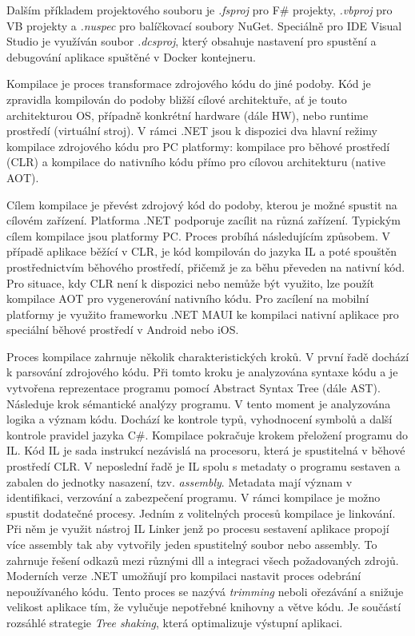 Dalším příkladem projektového souboru je \emph{.fsproj} pro F\# projekty, \emph{.vbproj} pro VB projekty a \emph{.nuspec} pro balíčkovací soubory NuGet. Speciálně pro IDE Visual Studio je využíván soubor \emph{.dcsproj}, který obsahuje nastavení pro spustění a debugování aplikace spuštěné v Docker kontejneru. 


Kompilace je proces transformace zdrojového kódu do jiné podoby. Kód je zpravidla kompilován do podoby bližší cílové architektuře, ať je touto architekturou OS, případně konkrétní hardware (dále HW), nebo runtime prostředí (virtuální stroj). \cite{Richter2012} V rámci .NET jsou k dispozici dva hlavní režimy kompilace zdrojového kódu pro PC platformy: kompilace pro běhové prostředí (CLR) a kompilace do nativního kódu přímo pro cílovou architekturu (native AOT).

Cílem kompilace je převést zdrojový kód do podoby, kterou je možné spustit na cílovém zařízení. Platforma .NET podporuje zacílit na různá zařízení. Typickým cílem kompilace jsou platformy PC. Proces probíhá následujícím způsobem. V případě aplikace běžící v CLR, je kód kompilován do jazyka IL a poté spouštěn prostřednictvím běhového prostředí, přičemž je za běhu převeden na nativní kód. \cite{Richter2012} Pro situace, kdy CLR není k dispozici nebo nemůže být využito, lze použít kompilace AOT pro vygenerování nativního kódu. \cite{Pflug2023} Pro zacílení na mobilní platformy je využito frameworku .NET MAUI ke kompilaci nativní aplikace pro speciální běhové prostředí v Android nebo iOS. \cite{Libery2023}


Proces kompilace zahrnuje několik charakteristických kroků. V první řadě dochází k parsování zdrojového kódu. Při tomto kroku je analyzována syntaxe kódu a je vytvořena reprezentace programu pomocí Abstract Syntax Tree (dále AST). Následuje krok sémantické analýzy programu. V tento moment je analyzována logika a význam kódu. Dochází ke kontrole typů, vyhodnocení symbolů a další kontrole pravidel jazyka C\#. Kompilace pokračuje krokem přeložení programu do IL. Kód IL je sada instrukcí nezávislá na procesoru, která je spustitelná v běhové prostředí CLR. \cite{Richter2012} V neposlední řadě je IL spolu s metadaty o programu sestaven a zabalen do jednotky nasazení, tzv. \emph{assembly}.  Metadata mají význam v identifikaci, verzování a zabezpečení programu. V rámci kompilace je možno spustit dodatečné procesy. Jedním z volitelných procesů kompilace je linkování. Při něm je využit nástroj IL Linker jenž po procesu sestavení aplikace propojí více assembly tak aby vytvořily jeden spustitelný soubor nebo assembly. \cite{Bock2016} To zahrnuje řešení odkazů mezi různými dll a integraci všech požadovaných zdrojů. Moderních verze .NET umožňují pro kompilaci nastavit proces odebrání nepoužívaného kódu. Tento proces se nazývá \emph{trimming} neboli ořezávání a snižuje velikost aplikace tím, že vylučuje nepotřebné knihovny a větve kódu. \cite{Price2023c8} Je součástí rozsáhlé strategie \emph{Tree shaking}, která optimalizuje výstupní aplikaci.

